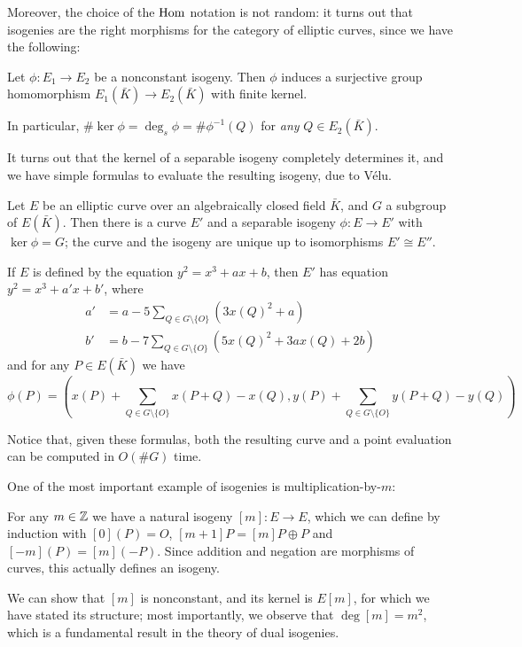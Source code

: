 Moreover, the choice of the $\operatorname{Hom}$ notation is not random: it turns out that isogenies are the right morphisms for the category of elliptic curves, since we have the following:
\begin{proposition}
    Let $\phi:E_1 \to E_2$ be a nonconstant isogeny. Then $\phi$ induces a surjective group homomorphism $E_1(\bar K)\to E_2(\bar K)$ with finite kernel.
    
    In particular, $\#\ker \phi = \deg_s\phi = \#\phi^{-1}(Q)$ for \emph{any} $Q\in E_2(\bar K)$.
\end{proposition}

It turns out that the kernel of a separable isogeny completely determines it, and we have simple formulas to evaluate the resulting isogeny, due to Vélu.
\begin{proposition}
    Let $E$ be an elliptic curve over an algebraically closed field $\bar K$, and $G$ a subgroup of $E(\bar K)$. Then there is a curve $E'$ and a separable isogeny $\phi:E\to E'$ with $\ker\phi=G$; the curve and the isogeny are unique up to isomorphisms $E'\cong E''$.
    
    If $E$ is defined by the equation $y^2=x^3+ax+b$, then $E'$ has equation $y^2=x^3+a'x+b'$, where
    \begin{align*}
    a' &= a-5\sum_{Q\in G\setminus\{O\}}(3x(Q)^2+a)\\
    b' &= b-7\sum_{Q\in G\setminus\{O\}}(5x(Q)^2+3ax(Q)+2b)
    \end{align*}
    and for any $P\in E(\bar K)$ we have
    $$\phi(P) = \left(x(P) + \sum_{Q\in G\setminus\{O\}} x(P+Q)-x(Q), y(P)+ \sum_{Q\in G\setminus\{O\}} y(P+Q)-y(Q)\right)$$
\end{proposition}

Notice that, given these formulas, both the resulting curve and a point evaluation can be computed in $O(\# G)$ time.

One of the most important example of isogenies is multiplication-by-$m$:
\begin{example}
    For any $m\in\mathbb{Z}$ we have a natural isogeny $[m]:E\to E$, which we can define by induction with $[0](P)=O$, $[m+1]P=[m]P\oplus P$ and $[-m](P)=[m](-P)$. Since addition and negation are morphisms of curves, this actually defines an isogeny.
    
    We can show that $[m]$ is nonconstant, and its kernel is $E[m]$, for which we have stated its structure; most importantly, we observe that $\deg[m]=m^2$, which is a fundamental result in the theory of dual isogenies.
\end{example}

